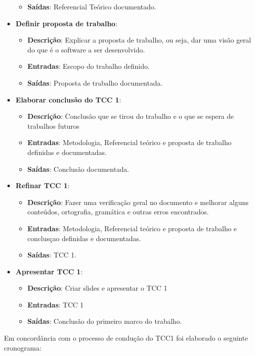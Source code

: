 \begin{itemize}
\begin{itemize}
    \item \textbf{Saídas}: Referencial Teórico documentado.
  \end{itemize}
  \item \textbf{Definir proposta de trabalho}:
  \begin{itemize}
    \item \textbf{Descrição}: Explicar a proposta de trabalho, ou seja, dar uma visão geral do que é o software a ser
      desenvolvido.
    \item \textbf{Entradas}: Escopo do trabalho definido.
    \item \textbf{Saídas}: Proposta de trabalho documentada.
  \end{itemize}
  \item \textbf{Elaborar conclusão do TCC 1}:
  \begin{itemize}
    \item \textbf{Descrição}: Conclusão que se tirou do trabalho e o que se espera de trabalhos futuros
    \item \textbf{Entradas}: Metodologia, Referencial teórico e proposta de trabalho definidas e documentadas.
    \item \textbf{Saídas}: Conclusão documentada.
  \end{itemize}
  \item \textbf{Refinar TCC 1}:
  \begin{itemize}
    \item \textbf{Descrição}: Fazer uma verificação geral no documento e melhorar alguns conteúdos, ortografia,
      gramática e outras erros encontrados.
    \item \textbf{Entradas}: Metodologia, Referencial teórico e proposta de trabalho e conclusçao definidas e documentadas.
    \item \textbf{Saídas}: TCC 1.
  \end{itemize}
  \item \textbf{Apresentar TCC 1}:
  \begin{itemize}
    \item \textbf{Descrição}: Criar slides e apresentar o TCC 1
    \item \textbf{Entradas}: TCC 1
    \item \textbf{Saídas}: Conclusão do primeiro marco do trabalho.
  \end{itemize}
\end{itemize}

Em concordância com o processo de condução do TCC1 foi elaborado o seguinte cronograma:

